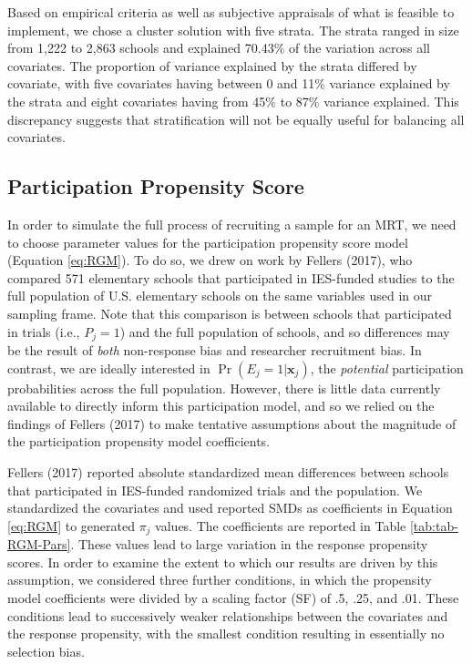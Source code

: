 \documentclass[
  english,
  man,floatsintext]{apa6}
\begin{document}
Based on empirical criteria as well as subjective appraisals of what is feasible to implement, we chose a cluster solution with five strata.
The strata ranged in size from 1,222 to 2,863 schools and explained 70.43\% of the variation across all covariates. The proportion of variance explained by the strata differed by covariate, with five covariates having between 0 and 11\% variance explained by the strata and eight covariates having from 45\% to 87\% variance explained. This discrepancy suggests that stratification will not be equally useful for balancing all covariates.

\hypertarget{participation-propensity-score}{%
\subsection{Participation Propensity Score}\label{participation-propensity-score}}

In order to simulate the full process of recruiting a sample for an MRT, we need to choose parameter values for the participation propensity score model (Equation \eqref{eq:RGM}).
To do so, we drew on work by Fellers (2017), who compared 571 elementary schools that participated in IES-funded studies to the full population of U.S. elementary schools on the same variables used in our sampling frame.
Note that this comparison is between schools that participated in trials (i.e., \(P_j = 1\)) and the full population of schools, and so differences may be the result of \emph{both} non-response bias and researcher recruitment bias.
In contrast, we are ideally interested in \(\Pr(E_j = 1 | \mathbf{x}_j)\), the \emph{potential} participation probabilities across the full population.
However, there is little data currently available to directly inform this participation model, and so we relied on the findings of Fellers (2017) to make tentative assumptions about the magnitude of the participation propensity model coefficients.

Fellers (2017) reported absolute standardized mean differences between schools that participated in IES-funded randomized trials and the population. We standardized the covariates and used reported SMDs as coefficients in Equation \eqref{eq:RGM} to generated \(\pi_j\) values. The coefficients are reported in Table \ref{tab:tab-RGM-Pars}.
These values lead to large variation in the response propensity scores. In order to examine the extent to which our results are driven by this assumption, we considered three further conditions, in which the propensity model coefficients were divided by a scaling factor (SF) of .5, .25, and .01.
These conditions lead to successively weaker relationships between the covariates and the response propensity, with the smallest condition resulting in essentially no selection bias.
\end{document}
